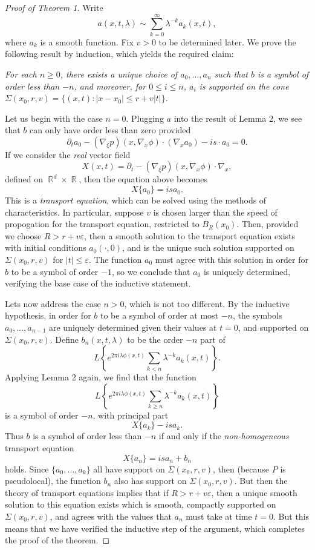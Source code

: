 \documentclass{article}
\theoremstyle{plain}
\theoremstyle{remark}
\theoremstyle{definition}
\DeclareMathOperator{\RR}{\mathbb{R}}
\begin{document}
\begin{proof}[Proof of Theorem 1]

Write
%
\[ a(x,t,\lambda) \sim \sum_{k = 0}^\infty \lambda^{-k} a_k(x,t), \]
%
where $a_k$ is a smooth function. Fix $v > 0$ to be determined later. We prove the following result by induction, which yields the required claim:
%
\begin{center}
	\emph{For each $n \geq 0$, there exists a unique choice of $a_0, \dots, a_n$ such that $b$ is a symbol of order less than $-n$, and moreover, for $0 \leq i \leq n$, $a_i$ is supported on the cone $\Sigma(x_0,r,v) = \{ (x,t) : |x - x_0| \leq r + v |t| \}$}.
\end{center}
%
Let us begin with the case $n = 0$. Plugging $a$ into the result of Lemma 2, we see that $b$ can only have order less than zero provided
%
\[ \partial_t a_0 - (\nabla_\xi p)(x, \nabla_x \phi) \cdot (\nabla_x a_0) - i s \cdot a_0 = 0. \]
%
If we consider the \emph{real} vector field
%
\[ X(x,t) = \partial_t - (\nabla_\xi p)(x,\nabla_x \phi) \cdot \nabla_x, \]
%
defined on $\RR^d \times \RR$, then the equation above becomes
%
\[ X \{ a_0 \} = i s a_0. \]
%
This is a \emph{transport equation}, which can be solved using the methods of characteristics. In particular, suppose $v$ is chosen larger than the speed of propogation for the transport equation, restricted to $B_R(x_0)$. Then, provided we choose $R > r + v \varepsilon$, then a smooth solution to the transport equation exists with initial conditions $a_0(\cdot,0)$, and is the unique such solution supported on $\Sigma(x_0,r,v)$ for $|t| \leq \varepsilon$. The function $a_0$ must agree with this solution in order for $b$ to be a symbol of order $-1$, so we conclude that $a_0$ is uniquely determined, verifying the base case of the inductive statement.

Lets now address the case $n > 0$, which is not too different. By the inductive hypothesis, in order for $b$ to be a symbol of order at most $-n$, the symbols $a_0, \dots, a_{n-1}$ are uniquely determined given their values at $t = 0$, and supported on $\Sigma(x_0,r,v)$. Define $b_n(x,t,\lambda)$ to be the order $-n$ part of
%
\[ L \left\{ e^{2 \pi i \lambda \phi(x,t)} \sum_{k < n} \lambda^{-k} a_k(x,t) \right\}. \]
%
Applying Lemma 2 again, we find that the function
%
\[ L \left\{ e^{2 \pi i \lambda \phi(x,t)} \sum_{k \geq n} \lambda^{-k} a_k(x,t) \right\} \]
%
is a symbol of order $-n$, with principal part
%
\[ X \{ a_k \} - i s a_k. \]
%
Thus $b$ is a symbol of order less than $-n$ if and only if the \emph{non-homogeneous} transport equation
%
\[ X \{ a_n \} = i s a_n + b_n \]
%
holds. Since $\{ a_0, \dots, a_k \}$ all have support on $\Sigma(x_0,r,v)$, then (because $P$ is pseudolocal), the function $b_n$ also has support on $\Sigma(x_0,r,v)$. But then the theory of transport equations implies that if $R > r + v \varepsilon$, then a unique smooth solution to this equation exists which is smooth, compactly supported on $\Sigma(x_0,r,v)$, and agrees with the values that $a_n$ must take at time $t = 0$. But this means that we have verified the inductive step of the argument, which completes the proof of the theorem.
\end{proof}
\end{document}
